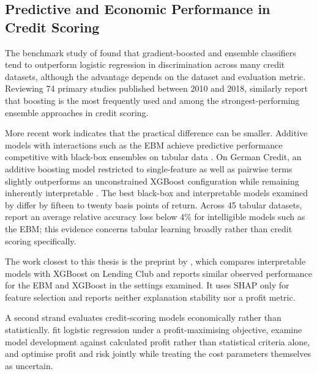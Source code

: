 \subsection{Predictive and Economic Performance in Credit Scoring}

The benchmark study of
\citet{lessmannBenchmarkingStateoftheartClassification2015} found that
gradient-boosted and ensemble classifiers tend to outperform logistic regression in
discrimination across many credit datasets, although the advantage depends on the
dataset and evaluation metric. Reviewing 74 primary studies published between 2010
and 2018, \citet{dastileStatisticalMachineLearning2020a} similarly report that
boosting is the most frequently used and among the strongest-performing ensemble
approaches in credit scoring.

More recent work indicates that the practical difference can be smaller. Additive
models with interactions such as the EBM achieve predictive performance competitive
with black-box ensembles on tabular data
\citep{changHowInterpretableTrustworthy2021}. On German Credit, an additive boosting
model restricted to single-feature as well as pairwise terms slightly outperforms an
unconstrained XGBoost configuration while remaining inherently interpretable
\citep{zouInterpretableCreditScoring2025}. The best black-box and interpretable
models examined by \citet{dessainCostExplainabilityAI2023} differ by fifteen to twenty
basis points of return. Across 45 tabular datasets,
\citet{amekoeExploringAccuracyInterpretability2024b} report an average relative
accuracy loss below 4\% for intelligible models such as the EBM; this evidence
concerns tabular learning broadly rather than credit scoring specifically.

The work closest to this thesis is the preprint by
\citet{schwartzEnhancingMLModels2025}, which compares interpretable models with
XGBoost on Lending Club and reports similar observed performance for the EBM and
XGBoost in the settings examined. It uses SHAP only for feature selection and reports
neither explanation stability nor a profit metric.

A second strand evaluates credit-scoring models economically rather than
statistically. \citet{devosPROFITMAXIMIZINGLOGISTIC2018} fit logistic regression under
a profit-maximising objective,
\citet{chroscickiAdvantageCaseTailoredInformation2022} examine model development
against calculated profit rather than statistical criteria alone, and
\citet{xuProfitRiskdrivenCredit2024} optimise profit and risk jointly while treating
the cost parameters themselves as uncertain.

